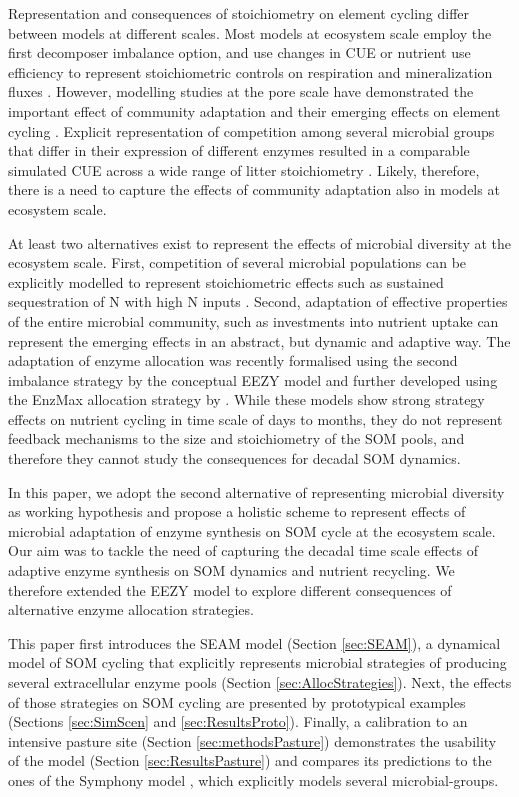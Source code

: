 Representation and consequences of stoichiometry on element cycling differ
between models at different scales. Most models at ecosystem scale employ the
first decomposer imbalance option, and use changes in CUE or nutrient use
efficiency to represent stoichiometric controls on respiration and mineralization fluxes
\citep{Manzoni08}. However, modelling studies at the pore scale have
demonstrated the important effect of community adaptation and their emerging
effects on element cycling \citep{Allison05, Resat11, Wang13}. Explicit
representation of competition among several microbial groups that differ in
their expression of different enzymes resulted in a comparable simulated CUE
across a wide range of litter stoichiometry \citep{Kaiser14}. Likely, therefore,
there is a need to capture the effects of community adaptation also in models at
ecosystem scale.

At least two alternatives exist to represent the effects of microbial diversity
at the ecosystem scale. First, competition of several microbial populations can
be explicitly modelled to represent stoichiometric effects such as sustained
sequestration of N with high N inputs \citep{Perveen14}. Second, adaptation of
effective properties of the entire microbial community, such as investments into
nutrient uptake \citep{Rastetter97, Rastetter11} can represent the emerging
effects in an abstract, but dynamic and adaptive way. The adaptation of enzyme
allocation was recently formalised using the second imbalance strategy by the
conceptual EEZY model \citep{Moorhead12} and further developed using the EnzMax
allocation strategy by \citet{Averill14}.
While these models show strong strategy effects on nutrient cycling in time
scale of days to months, they do not represent feedback mechanisms to the size
and stoichiometry of the SOM pools, and therefore they cannot study the
consequences for decadal SOM dynamics.

In this paper, we adopt the second alternative of representing microbial
diversity as working hypothesis and propose a holistic scheme to represent
effects of microbial adaptation of enzyme synthesis on SOM cycle at the
ecosystem scale. Our aim was to tackle the need of capturing the decadal time
scale effects of adaptive enzyme synthesis on SOM dynamics and nutrient
recycling. We therefore extended the EEZY model to explore different
consequences of alternative enzyme allocation strategies.

This paper first introduces the SEAM model (Section \ref{sec:SEAM}), a dynamical
model of SOM cycling that explicitly represents microbial strategies of
producing several extracellular enzyme pools (Section
\ref{sec:AllocStrategies}). Next, the effects of those strategies on SOM cycling
are presented by prototypical examples (Sections \ref{sec:SimScen} and
\ref{sec:ResultsProto}).
Finally, a calibration to an intensive pasture site (Section
\ref{sec:methodsPasture}) demonstrates the usability of the model (Section
\ref{sec:ResultsPasture}) and compares its predictions to the ones of the
Symphony model \citep{Perveen14}, which explicitly models several
microbial-groups. 

